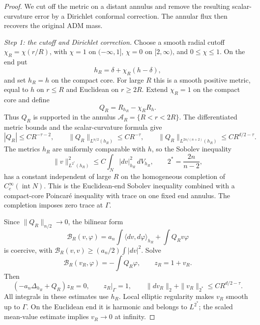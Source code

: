 \begin{proof}
We cut off the metric on a distant annulus and remove the resulting
scalar-curvature error by a Dirichlet conformal correction. The annular
flux then recovers the original ADM mass.

\smallskip\noindent\emph{Step 1: the cutoff and Dirichlet correction.}
Choose a smooth radial cutoff \(\chi_R=\chi(r/R)\), with
\(\chi=1\) on \((-\infty,1]\), \(\chi=0\) on \([2,\infty)\), and
\(0\le\chi\le1\). On the end put
\[
 h_R=\delta+\chi_R(h-\delta),
\]
and set \(h_R=h\) on the compact core. For large \(R\) this is a
smooth positive metric, equal to \(h\) on \(r\le R\) and Euclidean
on \(r\ge2R\). Extend \(\chi_R=1\) on the compact core and define
\[
 Q_R=R_{h_R}-\chi_R R_h.
\]
Thus \(Q_R\) is supported in the annulus
\(\mathcal A_R=\{R<r<2R\}\). The differentiated metric bounds and
the scalar-curvature formula give
\[
 |Q_R|\le C R^{-\tau-2},\qquad
 \|Q_R\|_{L^{n/2}(h_R)}\le C R^{-\tau},\qquad
 \|Q_R\|_{L^{2n/(n+2)}(h_R)}
       \le C R^{d/2-\tau}.
\]
The metrics \(h_R\) are uniformly comparable with \(h\), so the
Sobolev inequality
\[
 \|v\|_{L^{2^*}(h_R)}^2\le C\int_N|dv|_{h_R}^2\,dV_{h_R},
 \qquad 2^*=\frac{2n}{n-2},
\]
has a constant independent of large \(R\) on the homogeneous
completion of \(C_c^\infty(\operatorname{int}N)\). This is the
Euclidean-end Sobolev inequality combined with a compact-core
Poincar\'e inequality with trace on one fixed end annulus.
The completion imposes zero trace at \(\Gamma\).

Since \(\|Q_R\|_{n/2}\to0\), the bilinear form
\[
 \mathcal B_R(v,\varphi)
   =a_n\int\langle dv,d\varphi\rangle_{h_R}
      +\int Q_Rv\varphi
\]
is coercive, with
\(\mathcal B_R(v,v)\ge (a_n/2)\int|dv|^2\).
Solve
\[
 \mathcal B_R(v_R,\varphi)=-\int Q_R\varphi,\qquad z_R=1+v_R.
\]
Then
\[
 (-a_n\Delta_{h_R}+Q_R)z_R=0,\qquad
 z_R|_\Gamma=1,\qquad
 \|dv_R\|_2+\|v_R\|_{2^*}\le C R^{d/2-\tau}.
\]
All integrals in these estimates use \(h_R\).
Local elliptic regularity makes \(v_R\) smooth up to \(\Gamma\).
On the Euclidean end it is harmonic and belongs to \(L^{2^*}\);
the scaled mean-value estimate implies \(v_R\to0\) at infinity.


\end{proof}
